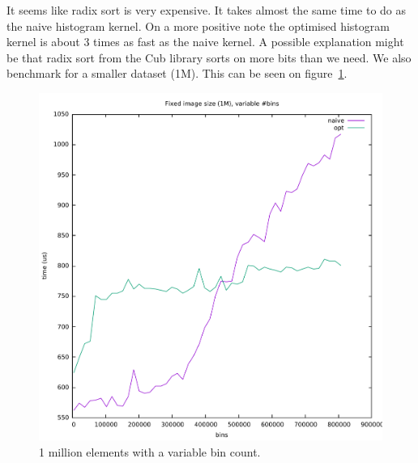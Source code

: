 \documentclass[12pt, a4paper, hidelinks]{article}
\begin{document}
It seems like radix sort is very expensive.
It takes almost the same time to do as the naive histogram kernel.
On a more positive note the optimised histogram kernel is about 3 times as
fast as the naive kernel. A possible explanation might be that radix sort
from the Cub library sorts on more bits than we need. We also benchmark
for a smaller dataset (1M). This can be seen on figure~\ref{fig:graph2}.

\begin{figure}[htpb]
    \centering
    \includegraphics[width=0.6\linewidth]{img/graphs/1M-varbins.pdf}
    \caption{1 million elements with a variable bin count.}
    \label{fig:graph2}
\end{figure}
\end{document}
